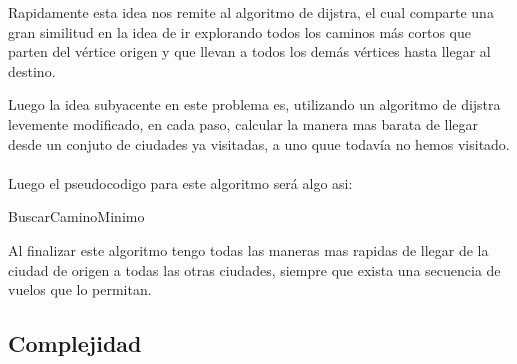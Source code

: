 Rapidamente esta idea nos remite al algoritmo de dijstra, el cual comparte una gran similitud en la idea de ir explorando todos los caminos más cortos que parten del vértice origen y que llevan a todos los demás vértices hasta llegar al destino.

Luego la idea subyacente en este problema es, utilizando un algoritmo de dijstra levemente modificado, en cada paso, calcular la manera mas barata de llegar desde un conjuto de ciudades ya visitadas, a uno quue todavía no hemos visitado.
\\
\\
Luego el pseudocodigo para este algoritmo será algo asi:

\begin{algorithm}
  \begin{algorithmic}[1]\parskip=1mm
 \caption{ BuscarCaminoMinimo}

  \end{algorithmic}
  \end{algorithm}

Al finalizar este algoritmo tengo todas las maneras mas rapidas de llegar de la ciudad de origen a todas las otras ciudades, siempre que exista una secuencia de vuelos que lo permitan.

\subsection{Complejidad}

